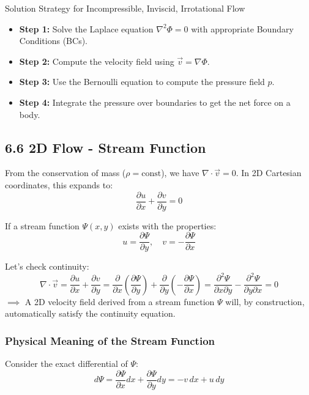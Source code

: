 \begin{mainbox}{Solution Strategy for Incompressible, Inviscid, Irrotational Flow}
\begin{itemize}
    \item \textbf{Step 1:} Solve the Laplace equation $\nabla^2 \Phi = 0$ with appropriate Boundary Conditions (BCs).
    \item \textbf{Step 2:} Compute the velocity field using $\vec{v} = \nabla \Phi$.
    \item \textbf{Step 3:} Use the Bernoulli equation to compute the pressure field $p$.
    \item \textbf{Step 4:} Integrate the pressure over boundaries to get the net force on a body.
\end{itemize}
\end{mainbox}

\newpage
\subsection{6.6 2D Flow - Stream Function}

From the conservation of mass ($\rho = \text{const}$), we have $\nabla \cdot \vec{v} = 0$.
In 2D Cartesian coordinates, this expands to:
\begin{equation}
    \frac{\partial u}{\partial x} + \frac{\partial v}{\partial y} = 0
\end{equation}

If a stream function $\Psi(x, y)$ exists with the properties:
\begin{equation}
    u = \frac{\partial \Psi}{\partial y}, \quad v = -\frac{\partial \Psi}{\partial x}
\end{equation}

Let's check continuity:
\begin{equation}
    \nabla \cdot \vec{v} = \frac{\partial u}{\partial x} + \frac{\partial v}{\partial y} = \frac{\partial}{\partial x}\left(\frac{\partial \Psi}{\partial y}\right) + \frac{\partial}{\partial y}\left(-\frac{\partial \Psi}{\partial x}\right) = \frac{\partial^2 \Psi}{\partial x \partial y} - \frac{\partial^2 \Psi}{\partial y \partial x} = 0
\end{equation}
$\implies$ A 2D velocity field derived from a stream function $\Psi$ will, by construction, automatically satisfy the continuity equation.

\subsubsection{Physical Meaning of the Stream Function}
Consider the exact differential of $\Psi$:
\begin{equation}
    d\Psi = \frac{\partial \Psi}{\partial x}dx + \frac{\partial \Psi}{\partial y}dy = -v\,dx + u\,dy
\end{equation}

